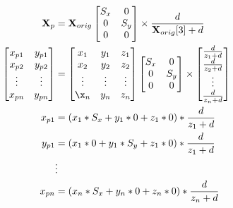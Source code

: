 \documentclass[10pt,b5paper,titlepage]{book}
\begin{document}
\begin{eqnarray}
    \begin{split}
        \mathbf{X}_p &= \mathbf{X}_{orig}
        \begin{bmatrix}
            S_x & 0 \\
            0 & S_y \\
            0 & 0
        \end{bmatrix} \times \frac{d}{\mathbf{X}_{orig}[3] + d} \\
        \begin{bmatrix}
            x_{p1} & y_{p1} \\
            x_{p2} & y_{p2} \\
            \vdots & \vdots \\
            x_{pn} & y_{pn}
        \end{bmatrix}
        &=
        \begin{bmatrix}
            x_1 & y_1 & z_1 \\
            x_2 & y_2 & z_2 \\
            \vdots & \vdots & \vdots \\
            \x_n & y_n & z_n
        \end{bmatrix}
        \begin{bmatrix}
            S_x & 0 \\
            0 & S_y \\
            0 & 0
        \end{bmatrix} \times
        \begin{bmatrix}
            \frac{d}{z_1 + d} \\
            \frac{d}{z_2 + d} \\
            \vdots \\
            \frac{d}{z_n + d}
        \end{bmatrix} \\
        x_{p1} &= (x_1 * S_x + y_1 * 0 + z_1 * 0) * \frac{d}{z_1 + d} \\
        y_{p1} &= (x_1 * 0 + y_1 * S_y + z_1 * 0) * \frac{d}{z_1 + d} \\
               & \vdots \\
        x_{pn} &= (x_n * S_x + y_n * 0 + z_n * 0) * \frac{d}{z_n + d} \\
    \end{split}
\end{eqnarray}
\end{document}
